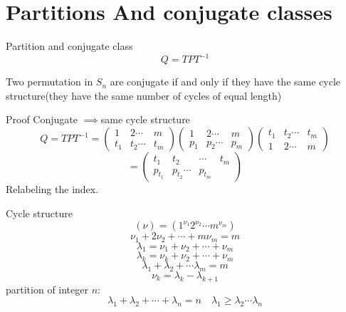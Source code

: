 \documentclass[11pt]{beamer}
\begin{document}
		\section{Partitions And conjugate classes}
\begin{frame}{Partition and conjugate class}
		\begin{equation}
		Q=TPT^{-1}
	\end{equation}
\begin{theorem}
	Two permutation in $S_n$ are conjugate if and only if they have the same cycle structure(they have the same number of cycles of equal length)
\end{theorem}
\end{frame}
\begin{frame}{Proof}
	Conjugate $\implies $same cycle structure
	\begin{equation}
		Q=TPT^{-1}=\begin{pmatrix}
			1&2\cdots&m\\
			t_1&t_2\cdots&t_m
		\end{pmatrix}\begin{pmatrix}
			1&2\cdots&m\\
			p_1&p_2\cdots&p_m
		\end{pmatrix}\begin{pmatrix}
		t_1&t_2\cdots&t_m\\
		1&2\cdots&m
		\end{pmatrix}
	\end{equation}
	\begin{equation}
	=\begin{pmatrix}
		t_1&t_2&\cdots & t_m\\
		p_{t_1}&p_{t_2}\cdots &p_{t_m}
	\end{pmatrix}
	\end{equation}
Relabeling the index.
\end{frame}
\begin{frame}{Cycle structure }
	\begin{equation}
		(\nu)=(1^{\nu_1}2^{\nu_2}\cdots m^{\nu_m})
	\end{equation}
	\begin{equation}
		\nu_1+2\nu_2+\cdots +m\nu_m=m
	\end{equation}
	\begin{equation}
		\lambda_1=\nu_1+\nu_2+\cdots +\nu_m
	\end{equation}
		\begin{equation}
		\lambda_k=\nu_k+\nu_2+\cdots +\nu_m
	\end{equation}
	\begin{equation}
		\lambda_1+\lambda_2+\cdots \lambda_m=m
	\end{equation}
	\begin{equation}
		\nu_k=\lambda_k-\lambda_{k+1}
	\end{equation}
	partition of integer $n$:
	\begin{equation*}
		\lambda_1+\lambda_2+\cdots+\lambda_n=n \quad \lambda_1\ge \lambda_2\cdots \lambda_n
	\end{equation*}
\end{frame}
\end{document}
